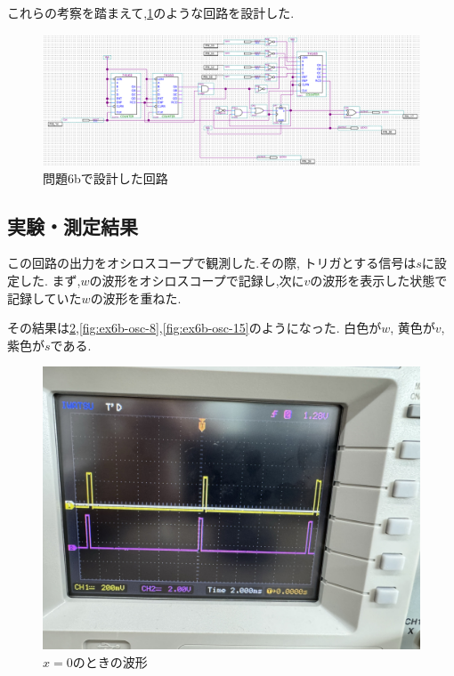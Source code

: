 \documentclass[autodetect-engine, dvi=dvipdfmx, 10pt, a4paper, ja=standard]{bxjsarticle}
\begin{document}
これらの考察を踏まえて,\ref{fig:ex6b}のような回路を設計した.

\begin{figure}[htbp]
	\centering
	\includegraphics[width=\columnwidth]{asset/ex6b.png}
	\caption{問題6bで設計した回路}
	\label{fig:ex6b}
\end{figure}

\subsection{実験・測定結果}
この回路の出力をオシロスコープで観測した.その際,
トリガとする信号は$s$に設定した.
まず,$w$の波形をオシロスコープで記録し,次に$v$の波形を表示した状態で
記録していた$w$の波形を重ねた.

その結果は\ref{fig:ex6b-osc-0},\ref{fig:ex6b-osc-8},\ref{fig:ex6b-osc-15}のようになった.
白色が$w$, 黄色が$v$, 紫色が$s$である.

\begin{figure}[H]
	\centering
	\includegraphics[width=0.8\columnwidth]{asset/ex6b_x_0.jpeg}
	\caption{$x = 0$のときの波形}
	\label{fig:ex6b-osc-0}
\end{figure}
\end{document}
